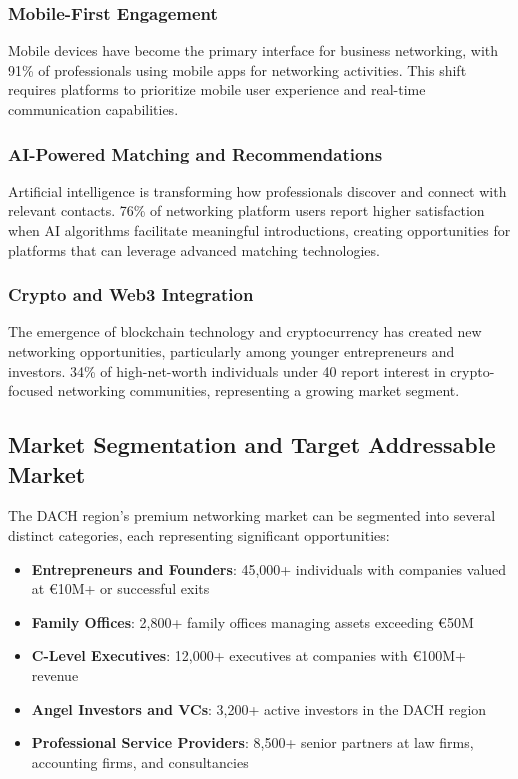 \subsubsection{Mobile-First Engagement}
Mobile devices have become the primary interface for business networking, with 91\% of professionals using mobile apps for networking activities. This shift requires platforms to prioritize mobile user experience and real-time communication capabilities.

\subsubsection{AI-Powered Matching and Recommendations}
Artificial intelligence is transforming how professionals discover and connect with relevant contacts. 76\% of networking platform users report higher satisfaction when AI algorithms facilitate meaningful introductions, creating opportunities for platforms that can leverage advanced matching technologies.

\subsubsection{Crypto and Web3 Integration}
The emergence of blockchain technology and cryptocurrency has created new networking opportunities, particularly among younger entrepreneurs and investors. 34\% of high-net-worth individuals under 40 report interest in crypto-focused networking communities, representing a growing market segment.

\subsection{Market Segmentation and Target Addressable Market}

The DACH region's premium networking market can be segmented into several distinct categories, each representing significant opportunities:

\begin{itemize}
    \item \textbf{Entrepreneurs and Founders}: 45,000+ individuals with companies valued at €10M+ or successful exits
    \item \textbf{Family Offices}: 2,800+ family offices managing assets exceeding €50M
    \item \textbf{C-Level Executives}: 12,000+ executives at companies with €100M+ revenue
    \item \textbf{Angel Investors and VCs}: 3,200+ active investors in the DACH region
    \item \textbf{Professional Service Providers}: 8,500+ senior partners at law firms, accounting firms, and consultancies
\end{itemize}

